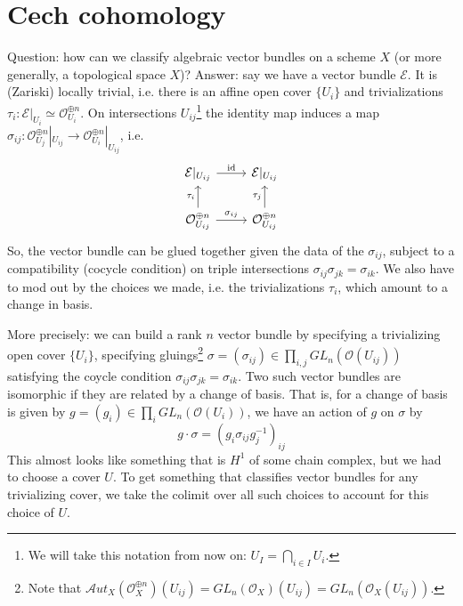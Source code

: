 \documentclass[10pt]{article}
\theoremstyle{definition}
\newcommand{\OO}{\mathcal{O}}
\begin{document}
\newpage

\section{Cech cohomology}

Question: how can we classify algebraic vector bundles on a scheme $X$ (or more generally, a topological space $X$)?  Answer: say we have a vector bundle $\mathcal{E}$.  It is (Zariski) locally trivial, i.e. there is an affine open cover $\{U_i\}$ and trivializations $\tau_i: \mathcal{E}|_{U_i} \simeq \OO_{U_i}^{\oplus n}$.  On intersections $U_{ij}$\footnote{We will take this notation from now on: $U_I = \bigcap_{i \in I} U_i$.} the identity map induces a map $\sigma_{ij}: \OO_{U_j}^{\oplus n}|_{U_{ij}} \rightarrow \OO_{U_i}^{\oplus n}|_{U_{ij}}$, i.e.
$$\begin{tikzcd}
\mathcal{E}|_{U_{ij}} \arrow[r, "\mathrm{id}"]  & \mathcal{E}|_{U_{ij}}  \\
\OO_{U_{ij}}^{\oplus n} \arrow[r, "\sigma_{ij}"] \arrow[u, "\tau_i"] & \OO_{U_{ij}}^{\oplus n}  \arrow[u, "\tau_j"] 
\end{tikzcd}$$
So, the vector bundle can be glued together given the data of the $\sigma_{ij}$, subject to a compatibility (cocycle condition) on triple intersections $\sigma_{ij} \sigma_{jk} = \sigma_{ik}$.  We also have to mod out by the choices we made, i.e. the trivializations $\tau_i$, which amount to a change in basis.

More precisely: we can build a rank $n$ vector bundle by specifying a trivializing open cover $\{U_i\}$, specifying gluings\footnote{Note that $\mathcal{A}ut_X(\OO_X^{\oplus n})(U_{ij}) = GL_n(\OO_X)(U_{ij}) = GL_n(\OO_X(U_{ij}))$.} $\sigma = (\sigma_{ij}) \in \prod_{i,j} GL_n(\OO(U_{ij}))$ satisfying the coycle condition $\sigma_{ij} \sigma_{jk} = \sigma_{ik}$.  Two such vector bundles are isomorphic if they are related by a change of basis.  That is, for a change of basis is given by $g = (g_i) \in \prod_i GL_n(\OO(U_i))$, we have an action of $g$ on $\sigma$ by
$$g \cdot \sigma = (g_i \sigma_{ij} g_j^{-1})_{ij}$$
This almost looks like something that is $H^1$ of some chain complex, but we had to choose a cover $U$.  To get something that classifies vector bundles for any trivializing cover, we take the colimit over all such choices to account for this choice of $U$.
\end{document}
